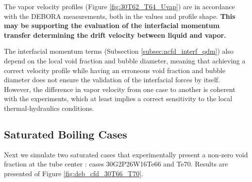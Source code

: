 \npar

The vapor velocity profiles (Figure \ref{fig:30T62_T64_Uvap}) are in accordance with the DEBORA measurements, both in the values and profile shape. \textbf{This may be supporting the evaluation of the interfacial momentum transfer determining the drift velocity between liquid and vapor.}

\begin{remark*}{}
The interfacial momentum terms (Subsection \ref{subsec:ncfd_interf_qdm}) also depend on the local void fraction and bubble diameter, meaning that achieving a correct velocity profile while having an erroneous void fraction and bubble diameter does not ensure the validation of the interfacial forces by itself. However, the difference in vapor velocity from one case to another is coherent with the experiments, which at least implies a correct sensitivity to the local thermal-hydraulics conditions.
\end{remark*}


\subsection{Saturated Boiling Cases}

Next we simulate two saturated cases that experimentally present a non-zero void fraction at the tube center : cases 30G2P26W16Te66 and Te70. Results are presented of Figure \ref{fig:deb_cfd_30T66_T70}.

